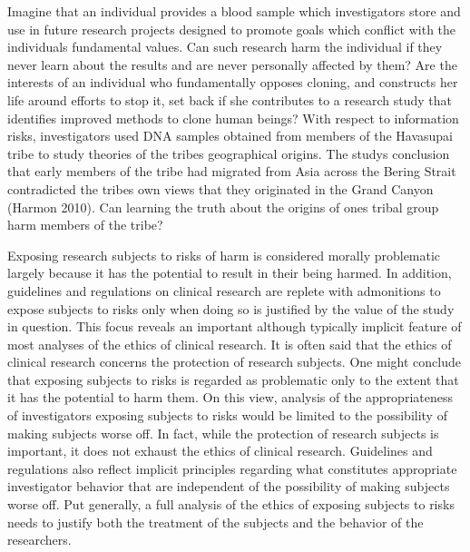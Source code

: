\documentclass[12p]{article}
\begin{document}
Imagine that an individual provides a blood sample which investigators store and use in future research projects designed to promote goals which conflict with the individuals fundamental values. Can such research harm the individual if they never learn about the results and are never personally affected by them? Are the interests of an individual who fundamentally opposes cloning, and constructs her life around efforts to stop it, set back if she contributes to a research study that identifies improved methods to clone human beings? With respect to information risks, investigators used DNA samples obtained from members of the Havasupai tribe to study theories of the tribes geographical origins. The studys conclusion that early members of the tribe had migrated from Asia across the Bering Strait contradicted the tribes own views that they originated in the Grand Canyon (Harmon 2010). Can learning the truth about the origins of ones tribal group harm members of the tribe?

Exposing research subjects to risks of harm is considered morally problematic largely because it has the potential to result in their being harmed. In addition, guidelines and regulations on clinical research are replete with admonitions to expose subjects to risks only when doing so is justified by the value of the study in question. This focus reveals an important although typically implicit feature of most analyses of the ethics of clinical research. It is often said that the ethics of clinical research concerns the protection of research subjects. One might conclude that exposing subjects to risks is regarded as problematic only to the extent that it has the potential to harm them. On this view, analysis of the appropriateness of investigators exposing subjects to risks would be limited to the possibility of making subjects worse off. In fact, while the protection of research subjects is important, it does not exhaust the ethics of clinical research. Guidelines and regulations also reflect implicit principles regarding what constitutes appropriate investigator behavior that are independent of the possibility of making subjects worse off. Put generally, a full analysis of the ethics of exposing subjects to risks needs to justify both the treatment of the subjects and the behavior of the researchers.
\end{document}
